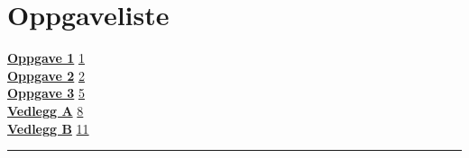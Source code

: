 \documentclass[12pt,a4paper]{article}
\begin{document}


\setcounter{page}{1}


\section*{Oppgaveliste}
\noindent
\hyperlink{oppgave1}{\textbf{Oppgave 1}} \hfill \hyperlink{oppgave1}{1} \\[.5em]
\hyperlink{oppgave2}{\textbf{Oppgave 2}} \hfill \hyperlink{oppgave2}{2} \\[.5em]
\hyperlink{oppgave3}{\textbf{Oppgave 3}} \hfill \hyperlink{oppgave3}{5} \\[.5em]
\hyperlink{Vedlegg A}{\textbf{Vedlegg A}} \hfill \hyperlink{Vedlegg A}{8} \\[.5em]
\hyperlink{Vedlegg B}{\textbf{Vedlegg B}} \hfill \hyperlink{Vedlegg B}{11} \\[.5em]
\noindent\rule{\textwidth}{1pt}

\clearpage
{}
\setcounter{page}{1}

\clearpage


\clearpage


\clearpage


\clearpage


\clearpage
\end{document}
